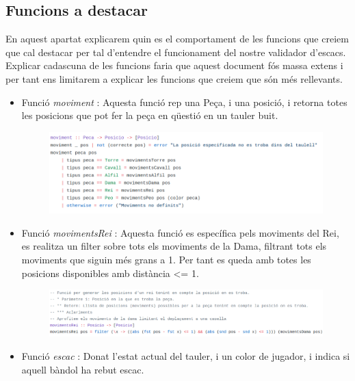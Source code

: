\documentclass[12pt]{article}
\begin{document}
\subsection{Funcions a destacar}
En aquest apartat explicarem quin es el comportament de les funcions que creiem que cal destacar per tal d'entendre el funcionament del nostre validador d'escacs. Explicar cadascuna de les funcions faria que aquest document fós massa extens i per tant ens limitarem a explicar les funcions que creiem que són més rellevants.

\begin{itemize}
\item Funció \textit{moviment} : Aquesta funció rep una Peça, i una posició, i retorna totes les posicions que pot fer la peça en qüestió en un tauler buit.

\begin{figure}[htb]
\begin{center}
\includegraphics[width=17cm]{funcio_moviment}
\end{center}
\end{figure}

\item Funció \textit{movimentsRei} : Aquesta funció es específica pels moviments del Rei, es realitza un filter sobre tots els moviments de la Dama, filtrant tots els moviments que siguin més grans a 1. Per tant es queda amb totes les posicions disponibles amb distància <= 1.

\begin{figure}[htb]
\begin{center}
\includegraphics[width=18cm]{movimentsRei}
\end{center}
\end{figure}

\item Funció \textit{escac} : Donat l'estat actual del tauler, i un color de jugador, i indica si aquell bàndol ha rebut escac.


\end{itemize}
\end{document}
